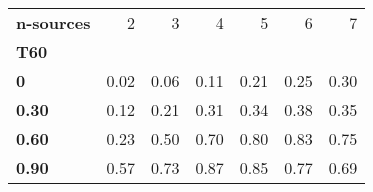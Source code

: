 \begin{tabular}{lrrrrrr}
\toprule
\textbf{n-sources} &    2 &    3 &    4 &    5 &    6 &    7 \\
\textbf{T60 } &      &      &      &      &      &      \\
\midrule
\textbf{0   } & 0.02 & 0.06 & 0.11 & 0.21 & 0.25 & 0.30 \\
\textbf{0.30} & 0.12 & 0.21 & 0.31 & 0.34 & 0.38 & 0.35 \\
\textbf{0.60} & 0.23 & 0.50 & 0.70 & 0.80 & 0.83 & 0.75 \\
\textbf{0.90} & 0.57 & 0.73 & 0.87 & 0.85 & 0.77 & 0.69 \\
\bottomrule
\end{tabular}

